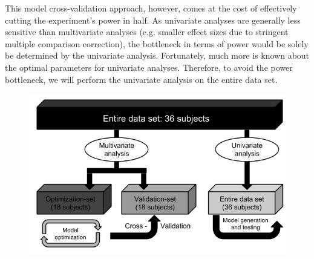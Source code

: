 \documentclass[12pt,a4paper]{article}\usepackage[]{graphicx}\usepackage[]{color}
\begin{document}
This model cross-validation approach, however, comes at the cost of effectively cutting the experiment's power in half. As univariate analyses are generally less sensitive than multivariate analyses (e.g. smaller effect sizes due to stringent multiple comparison correction), the bottleneck in terms of power would be solely be determined by the univariate analysis. Fortunately, much more is known about the optimal parameters for univariate analyses. Therefore, to avoid the power bottleneck, we will perform the univariate analysis on the entire data set.

\begin{figure}[t]
\centering
\includegraphics[scale=.5]{ModelOptimization}
\label{fig:figure1}
\end{figure}


\end{document}
